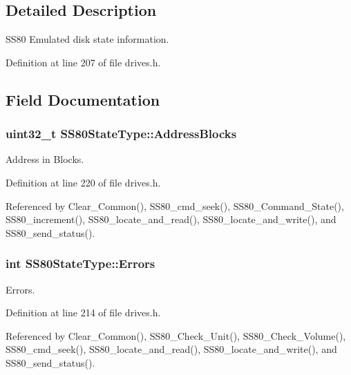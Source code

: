 \subsection{Detailed Description}
S\+S80 Emulated disk state information. 

Definition at line 207 of file drives.\+h.



\subsection{Field Documentation}
\subsubsection[{\texorpdfstring{Address\+Blocks}{AddressBlocks}}]{\setlength{\rightskip}{0pt plus 5cm}uint32\+\_\+t S\+S80\+State\+Type\+::\+Address\+Blocks}\hypertarget{structSS80StateType_a6cffa1e36a57bce4188ede4bd9dbd7ad}{}\label{structSS80StateType_a6cffa1e36a57bce4188ede4bd9dbd7ad}


Address in Blocks. 



Definition at line 220 of file drives.\+h.



Referenced by Clear\+\_\+\+Common(), S\+S80\+\_\+cmd\+\_\+seek(), S\+S80\+\_\+\+Command\+\_\+\+State(), S\+S80\+\_\+increment(), S\+S80\+\_\+locate\+\_\+and\+\_\+read(), S\+S80\+\_\+locate\+\_\+and\+\_\+write(), and S\+S80\+\_\+send\+\_\+status().

\subsubsection[{\texorpdfstring{Errors}{Errors}}]{\setlength{\rightskip}{0pt plus 5cm}int S\+S80\+State\+Type\+::\+Errors}\hypertarget{structSS80StateType_a7a5c363c6f617ee457a4daacadb3a7b2}{}\label{structSS80StateType_a7a5c363c6f617ee457a4daacadb3a7b2}


Errors. 



Definition at line 214 of file drives.\+h.



Referenced by Clear\+\_\+\+Common(), S\+S80\+\_\+\+Check\+\_\+\+Unit(), S\+S80\+\_\+\+Check\+\_\+\+Volume(), S\+S80\+\_\+cmd\+\_\+seek(), S\+S80\+\_\+locate\+\_\+and\+\_\+read(), S\+S80\+\_\+locate\+\_\+and\+\_\+write(), and S\+S80\+\_\+send\+\_\+status().

